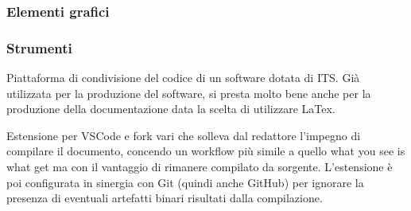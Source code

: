 

\subsubsection{Elementi grafici}



\subsubsection{Strumenti}

    Piattaforma di condivisione del codice di un software dotata di ITS. Già utilizzata per la produzione del software, si presta
    molto bene anche per la produzione della documentazione data la scelta di utilizzare LaTex.

    Estensione per VSCode e fork vari che solleva dal redattore l'impegno di compilare il documento, concendo un workflow più simile
    a quello what you see is what get ma con il vantaggio di rimanere compilato da sorgente.
    L'estensione è poi configurata in sinergia con Git (quindi anche GitHub) per ignorare la presenza di eventuali artefatti binari
    risultati dalla compilazione.

